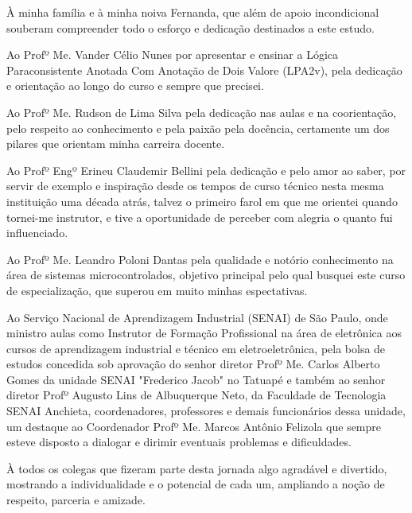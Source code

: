 À minha família e à minha noiva Fernanda, que além de apoio incondicional souberam compreender todo o esforço e dedicação destinados a este estudo.

Ao Profº Me. Vander Célio Nunes por apresentar e ensinar a Lógica Paraconsistente Anotada Com Anotação de Dois Valore (LPA2v), pela dedicação e orientação ao longo do curso e sempre que precisei.

Ao Profº Me. Rudson de Lima Silva pela dedicação nas aulas e na coorientação, pelo respeito ao conhecimento e pela paixão pela docência, certamente um dos pilares que orientam minha carreira docente.

Ao Profº Engº Erineu Claudemir Bellini pela dedicação e pelo amor ao saber, por servir de exemplo e inspiração desde os tempos de curso técnico nesta mesma instituição uma década atrás, talvez o primeiro farol em que me orientei quando tornei-me instrutor, e tive a oportunidade de perceber com alegria o quanto fui influenciado. 

Ao Profº Me. Leandro Poloni Dantas pela qualidade e notório conhecimento na área de sistemas microcontrolados, objetivo principal pelo qual busquei este curso de especialização, que superou em muito minhas espectativas.

Ao Serviço Nacional de Aprendizagem Industrial (SENAI) de São Paulo, onde ministro aulas como Instrutor de Formação Profissional na área de eletrônica aos cursos de aprendizagem industrial e técnico em eletroeletrônica, pela bolsa de estudos concedida sob aprovação do senhor diretor Profº Me. Carlos Alberto Gomes da unidade SENAI "Frederico Jacob" no Tatuapé e também ao senhor diretor Profº Augusto Lins de Albuquerque Neto, da Faculdade de Tecnologia SENAI Anchieta, coordenadores, professores e demais funcionários dessa unidade, um destaque ao Coordenador Profº Me. Marcos Antônio Felizola que sempre esteve disposto a dialogar e dirimir eventuais problemas e dificuldades.

À todos os colegas que fizeram parte desta jornada algo agradável e divertido, mostrando a individualidade e o potencial de cada um, ampliando a noção de respeito, parceria e amizade. 

 
